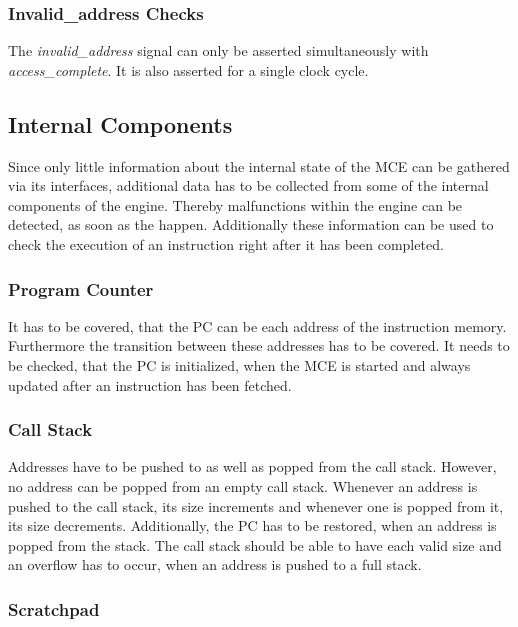 \subsubsection{Invalid\_address Checks}

The \emph{invalid\_address} signal can only be asserted simultaneously with \emph{access\_complete}.
It is also asserted for a single clock cycle.

\subsection{Internal Components}

Since only little information about the internal state of the MCE can be gathered via its interfaces, additional data has to be collected from some of the
internal components of the engine. 
Thereby malfunctions within the engine can be detected, as soon as the happen.
Additionally these information can be used to check the execution of an instruction right after it has been completed.

\subsubsection{Program Counter}

It has to be covered, that the PC can be each address of the instruction memory. Furthermore the transition between these addresses has to be covered.
It needs to be checked, that the PC is initialized, when the MCE is started and always updated after an instruction has been fetched.

\subsubsection{Call Stack}

Addresses have to be pushed to as well as popped from the call stack. However, no address can be popped from an empty call stack.
Whenever an address is pushed to the call stack, its size increments and whenever one is popped from it, its size decrements.
Additionally, the PC has to be restored, when an address is popped from the stack.
The call stack should be able to have each valid size and an overflow has to occur, when an address is pushed to a full stack.

\subsubsection{Scratchpad}

